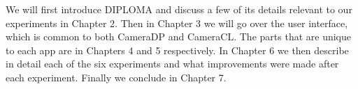 We will first introduce DIPLOMA and discuss a few of its details relevant to our experiments in Chapter 2. Then in Chapter 3 we will go over the user interface, which is common to both CameraDP and CameraCL. The parts that are unique to each app are in Chapters 4 and 5 respectively. In Chapter 6 we then describe in detail each of the six experiments and what improvements were made after each experiment. Finally we conclude in Chapter 7.